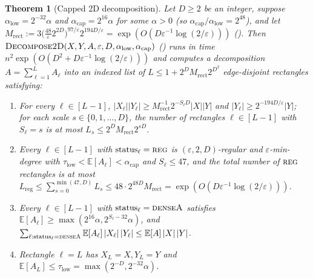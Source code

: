 \documentclass[11pt]{article}
\newtheorem{theorem}{Theorem}[section]
\theoremstyle{definition}
\renewcommand{\label}[1]{}%
\newcommand{\E}{\mathbb{E}}
\newcommand{\abs}[1]{\left\lvert #1 \right\rvert}
\newcommand{\dens}[1]{\E[#1]}
\newcommand{\DecomposeTwoD}{\textnormal{\textsc{Decompose2D}}}
\newcommand{\tagreg}{\textnormal{\textsc{reg}}}
\newcommand{\tagdenseA}{\textnormal{\textsc{denseA}}}
\begin{document}
\begin{theorem}[Capped 2D decomposition]
\label{thm:2d-decomp}
Let $D \ge 2$ be an integer, suppose $\alpha_{\text{low}} = 2^{-32}\alpha$ and $\alpha_{\text{cap}} = 2^{16}\alpha$ for some $\alpha > 0$ (so $\alpha_{\text{cap}}/\alpha_{\text{low}} = 2^{48}$), and let $M_{\text{rect}} := 3\big(\frac{48}{\varepsilon} 2^{2D}\big)^{97/\varepsilon} 2^{194D/\varepsilon} = \exp(O(D\varepsilon^{-1}\log(2/\varepsilon)))$ (). Then $\DecomposeTwoD(X, Y, A, \varepsilon, D, \alpha_{\text{low}}, \alpha_{\text{cap}})$ () runs in time $n^2 \exp(O(D^2 + D\varepsilon^{-1}\log(2/\varepsilon)))$ and computes a decomposition $A = \sum_{\ell=1}^L A_\ell$ into an indexed list of $L \le 1 + 2^D M_{\text{rect}} 2^{D^2}$ edge-disjoint rectangles satisfying:
\begin{enumerate}[leftmargin=*]
    \item For every $\ell \in [L-1]$, $\abs{X_\ell}\abs{Y_\ell} \ge M_{\text{rect}}^{-1} 2^{-S_\ell D}\abs{X}\abs{Y}$ and $\abs{Y_\ell} \ge 2^{-194D/\varepsilon}\abs{Y}$; for each scale $s \in \{0, 1, \dots, D\}$, the number of rectangles $\ell \in [L-1]$ with $S_\ell = s$ is at most $L_s \le 2^D M_{\text{rect}} 2^{s D}$.
    \item Every $\ell \in [L-1]$ with $\text{status}_\ell = \tagreg$ is $(\varepsilon, 2, D)$-regular and $\varepsilon$-min-degree with $\tau_{\text{low}} < \dens{A_\ell} < \alpha_{\text{cap}}$ and $S_\ell \le 47$, and the total number of $\tagreg$ rectangles is at most $L_{\text{reg}} \le \sum_{s=0}^{\min(47, D)} L_s \le 48 \cdot 2^{48D} M_{\text{rect}} = \exp(O(D\varepsilon^{-1}\log(2/\varepsilon)))$.
    \item Every $\ell \in [L-1]$ with $\text{status}_\ell = \tagdenseA$ satisfies $\dens{A_\ell} \ge \max(2^{16}\alpha, 2^{S_\ell - 32}\alpha)$, and $\sum_{\ell : \text{status}_\ell = \tagdenseA} \dens{A_\ell}\abs{X_\ell}\abs{Y_\ell} \le \dens{A}\abs{X}\abs{Y}$.
    \item Rectangle $\ell = L$ has $X_L = X, Y_L = Y$ and $\dens{A_L} \le \tau_{\text{low}} = \max(2^{-D}, 2^{-32}\alpha)$.
\end{enumerate}
\end{theorem}
\end{document}
